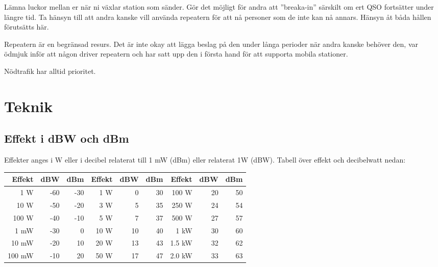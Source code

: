 Lämna luckor mellan er när ni växlar station som sänder. Gör det möjligt för andra att ''breaka-in'' särskilt om ert QSO fortsätter under längre tid. Ta hänsyn till att andra kanske vill använda repeatern för att nå personer som de inte kan nå annars. Hänsyn åt båda hållen förutsätts här. 

Repeatern är en begränsad resurs. Det är inte okay att lägga beslag på den under långa perioder när andra kanske behöver den, var ödmjuk inför att någon driver repeatern och har satt upp den i första hand för att supporta mobila stationer.

Nödtrafik har alltid prioritet.



\section{Teknik}

\subsection{Effekt i dBW och dBm}

Effekter anges i W eller i decibel relaterat till 1 mW (dBm) eller relaterat 1W (dBW). Tabell över effekt och decibelwatt nedan:
\begin{center}
\begin{tabular}{rrr|rrr|rrr}
	   \textbf{Effekt} & \textbf{dBW} & \textbf{dBm} & \textbf{Effekt} & \textbf{dBW} & \textbf{dBm} & \textbf{Effekt} & \textbf{dBW} & \textbf{dBm} \\ \hline
	  1 \textmu W &          -60 &          -30 &        1 W &            0 &           30 &      100 W &           20 &           50 \\
	 10 \textmu W &          -50 &          -20 &        3 W &            5 &           35 &      250 W &           24 &           54 \\
	100 \textmu W &          -40 &          -10 &        5 W &            7 &           37 &      500 W &           27 &           57 \\
	         1 mW &          -30 &            0 &       10 W &           10 &           40 &       1 kW &           30 &           60 \\
	        10 mW &          -20 &           10 &       20 W &           13 &           43 &     1.5 kW &           32 &           62 \\
	       100 mW &          -10 &           20 &       50 W &           17 &           47 &     2.0 kW &           33 &           63
\end{tabular}
\end{center}

